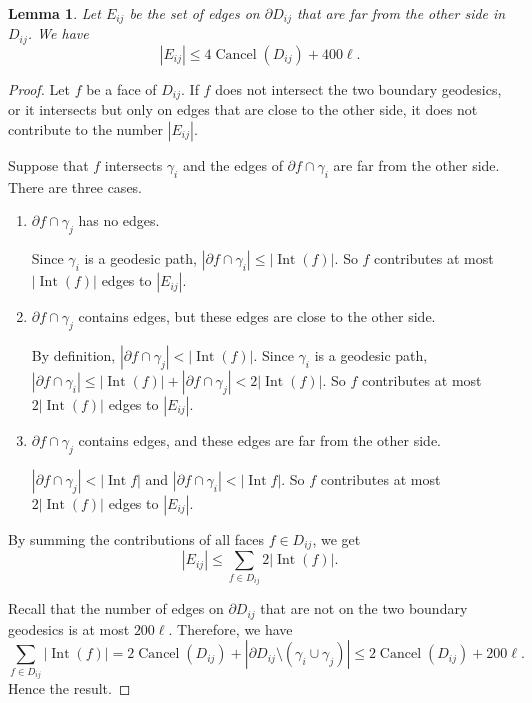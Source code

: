 \documentclass[a4paper]{article}
\DeclareMathOperator{\Int}{Int}
\DeclareMathOperator{\Cancel}{Cancel}
\newtheorem{lem}[thm]{Lemma}
\theoremstyle{remark}
\begin{document}
\begin{lem} \label{lem estimation far from the other side}
    Let $E_{ij}$ be the set of edges on $\partial D_{ij}$ that are far from the other side in $D_{ij}$. We have
    \[|E_{ij}|\leq 4\Cancel(D_{ij}) + 400\ell.\]
\end{lem}
\begin{proof}
    Let $f$ be a face of $D_{ij}$. If $f$ does not intersect the two boundary geodesics, or it intersects but only on edges that are close to the other side, it does not contribute to the number $|E_{ij}|$.
    
    Suppose that $f$ intersects $\gamma_i$ and the edges of $\partial f \cap \gamma_i$ are far from the other side. There are three cases.
    
    \begin{enumerate}[{Case} 1.]
        \item $\partial f\cap \gamma_j$ has no edges.
        
        Since $\gamma_i$ is a geodesic path, $|\partial f \cap \gamma_i| \leq |\Int(f)|$. So $f$ contributes at most $|\Int(f)|$ edges to $|E_{ij}|$.

        \item $\partial f\cap \gamma_j$ contains edges, but these edges are close to the other side.

        By definition, $|\partial f \cap \gamma_j|<|\Int (f)|$. Since $\gamma_i$ is a geodesic path, $|\partial f \cap \gamma_i| \leq |\Int(f)| + |\partial f \cap \gamma_j| < 2|\Int(f)|$. So $f$ contributes at most $2|\Int(f)|$ edges to $|E_{ij}|$.
        
        \item $\partial f\cap \gamma_j$ contains edges, and these edges are far from the other side.

        $|\partial f \cap \gamma_j|<|\Int f|$ and $|\partial f \cap \gamma_i|<|\Int f|$. So $f$ contributes at most $2|\Int(f)|$ edges to $|E_{ij}|$.
    \end{enumerate}
    By summing the contributions of all faces $f\in D_{ij}$, we get \[|E_{ij}|\leq \sum_{f\in D_{ij}}2|\Int(f)|.\]
    
    Recall that the number of edges on $\partial D_{ij}$ that are not on the two boundary geodesics is at most $200\ell$. Therefore, we have
    \[\sum_{f\in D_{ij}}|\Int(f)| = 2\Cancel(D_{ij})+|\partial D_{ij}\setminus (\gamma_i\cup\gamma_j)| \leq 2\Cancel(D_{ij})+200\ell .\]
    Hence the result.

\end{proof}
\end{document}
